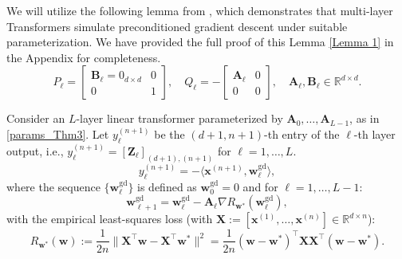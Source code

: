 \documentclass[11pt]{article}
\numberwithin{equation}{section}
\begin{document}
We will utilize the following lemma from \cite{ahn2024transformers}, which demonstrates that multi-layer Transformers simulate preconditioned gradient descent under suitable parameterization. We have provided the full proof of this Lemma \ref{Lemma 1} in the Appendix for completeness.
\begin{equation}
P_\ell = 
\begin{bmatrix}
\mathbf B_\ell = 0_{d \times d} & 0 \\
0 & 1
\end{bmatrix},
\quad
Q_\ell = 
-\begin{bmatrix}
\mathbf{A}_\ell & 0 \\
0 & 0
\end{bmatrix}, \quad \mathbf{A}_\ell, \mathbf{B}_\ell \in \mathbb{R}^{d \times d}.
\label{params_Thm3}
\end{equation}
\begin{lemma}
    Consider an \(L\)-layer linear transformer parameterized by \(\mathbf{A}_0, \dots, \mathbf{A}_{L-1}\), as in \eqref{params_Thm3}. Let \(y_\ell^{(n+1)}\) be the \((d+1, n+1)\)-th entry of the \(\ell\)-th layer output, i.e., \(y_\ell^{(n+1)} = [\mathbf{Z}_\ell]_{(d+1),(n+1)}\) for \(\ell = 1, \dots, L\).
    \begin{equation}
    y_\ell^{(n+1)} = -\langle \mathbf{x}^{(n+1)}, \mathbf{w}_{\ell}^{\mathrm{gd}} \rangle,
    \end{equation}
    where the sequence \(\{\mathbf{w}_{\ell}^{\mathrm{gd}}\}\) is defined as \(\mathbf{w}_{0}^{\mathrm{gd}} = 0\) and for \(\ell = 1, \dots, L-1\):
    \begin{equation}
    \mathbf{w}_{\ell+1}^{\mathrm{gd}} = \mathbf{w}_{\ell}^{\mathrm{gd}} - \mathbf{A}_\ell \nabla R_{\mathbf{w}^*}(\mathbf{w}_{\ell}^{\mathrm{gd}}),
    \end{equation}
    with the empirical least-squares loss (with \(\mathbf{X} := [\mathbf x^{(1)}, \ldots, \mathbf x^{(n)}] \in \mathbb R^{d \times n}\)):
    \begin{equation}
    R_{\mathbf{w}^*}(\mathbf{w}) := \frac{1}{2n} \|\mathbf{X}^\top \mathbf{w} - \mathbf{X}^\top \mathbf{w}^*\|^2 = \frac{1}{2n} (\mathbf{w} - \mathbf{w}^*)^\top \mathbf{X} \mathbf{X}^\top (\mathbf{w} - \mathbf{w}^*).
    \label{in-context-loss}
    \end{equation}
\label{Lemma 1}
\end{lemma}
\end{document}
